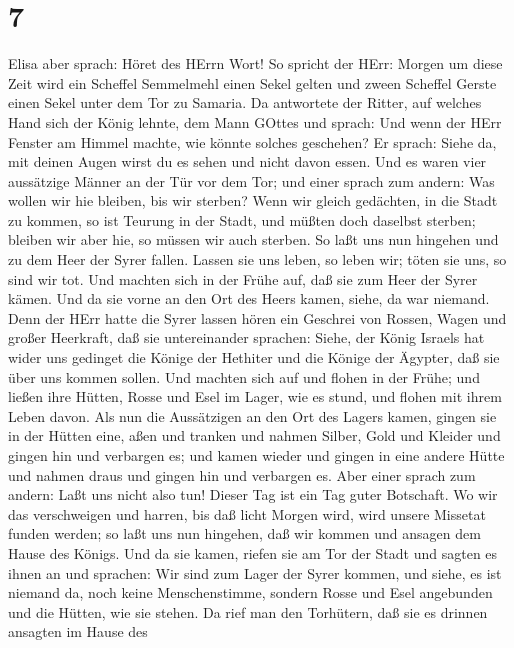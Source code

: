 \hypertarget{section-6}{%
\section{7}\label{section-6}}

 Elisa aber sprach: Höret des HErrn Wort! So spricht der
HErr: Morgen um diese Zeit wird ein Scheffel Semmelmehl einen Sekel
gelten und zween Scheffel Gerste einen Sekel unter dem Tor zu Samaria.
 Da antwortete der Ritter, auf welches Hand sich der König
lehnte, dem Mann GOttes und sprach: Und wenn der HErr Fenster am Himmel
machte, wie könnte solches geschehen? Er sprach: Siehe da, mit deinen
Augen wirst du es sehen und nicht davon essen.  Und es waren
vier aussätzige Männer an der Tür vor dem Tor; und einer sprach zum
andern: Was wollen wir hie bleiben, bis wir sterben?  Wenn
wir gleich gedächten, in die Stadt zu kommen, so ist Teurung in der
Stadt, und müßten doch daselbst sterben; bleiben wir aber hie, so müssen
wir auch sterben. So laßt uns nun hingehen und zu dem Heer der Syrer
fallen. Lassen sie uns leben, so leben wir; töten sie uns, so sind wir
tot.  Und machten sich in der Frühe auf, daß sie zum Heer
der Syrer kämen. Und da sie vorne an den Ort des Heers kamen, siehe, da
war niemand.  Denn der HErr hatte die Syrer lassen hören ein
Geschrei von Rossen, Wagen und großer Heerkraft, daß sie untereinander
sprachen: Siehe, der König Israels hat wider uns gedinget die Könige der
Hethiter und die Könige der Ägypter, daß sie über uns kommen sollen.
 Und machten sich auf und flohen in der Frühe; und ließen
ihre Hütten, Rosse und Esel im Lager, wie es stund, und flohen mit ihrem
Leben davon.  Als nun die Aussätzigen an den Ort des Lagers
kamen, gingen sie in der Hütten eine, aßen und tranken und nahmen
Silber, Gold und Kleider und gingen hin und verbargen es; und kamen
wieder und gingen in eine andere Hütte und nahmen draus und gingen hin
und verbargen es.  Aber einer sprach zum andern: Laßt uns
nicht also tun! Dieser Tag ist ein Tag guter Botschaft. Wo wir das
verschweigen und harren, bis daß licht Morgen wird, wird unsere Missetat
funden werden; so laßt uns nun hingehen, daß wir kommen und ansagen dem
Hause des Königs.  Und da sie kamen, riefen sie am Tor der
Stadt und sagten es ihnen an und sprachen: Wir sind zum Lager der Syrer
kommen, und siehe, es ist niemand da, noch keine Menschenstimme, sondern
Rosse und Esel angebunden und die Hütten, wie sie stehen. 
Da rief man den Torhütern, daß sie es drinnen ansagten im Hause des
